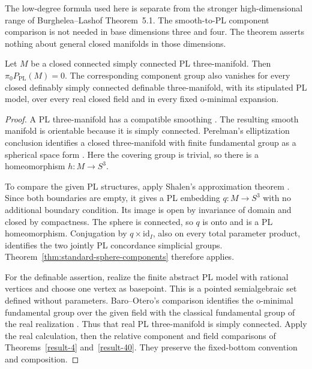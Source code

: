 The low-degree formula used here is separate from the stronger
high-dimensional range of Burghelea--Lashof Theorem~5.1.
The smooth-to-PL component comparison is not needed in base
dimensions three and four.  The theorem asserts nothing about
general closed manifolds in those dimensions.

\begin{corollary}\label{cor:simply-connected-three-components}
Let $M$ be a closed connected simply connected PL three-manifold.
Then $\pi_0P_{\mathrm{PL}}(M)=0$.  The corresponding component group
also vanishes for every closed definably simply connected definable
three-manifold, with its stipulated PL model, over every real closed
field and in every fixed o-minimal expansion.
\end{corollary}

\begin{proof}
A PL three-manifold has a compatible smoothing
\cite[Essay~I, p.~39]{KirbySiebenmann1977}.  The resulting smooth
manifold is orientable because it is simply connected.  Perelman's
elliptization conclusion identifies a closed three-manifold with
finite fundamental group as a spherical space form
\cite[Section~1.4, p.~3]{Perelman2003Extinction}.  Here the covering
group is trivial, so there is a homeomorphism $h:M\to S^3$.

To compare the given PL structures, apply Shalen's approximation
theorem \cite[Approximation Theorem, p.~34; proof in Section~9,
pp.~75--79]{Shalen1984}.  Since both boundaries are empty, it gives a
PL embedding $q:M\to S^3$ with no additional boundary condition.
Its image is open by invariance of domain and closed by compactness.
The sphere is connected, so $q$ is onto and is a PL homeomorphism.
Conjugation by $q\times\mathrm{id}_I$, also on every total parameter
product, identifies the two jointly PL concordance simplicial groups.
Theorem~\ref{thm:standard-sphere-components} therefore applies.

For the definable assertion, realize the finite abstract PL model
with rational vertices and choose one vertex as basepoint.  This is
a pointed semialgebraic set defined without parameters.
Baro--Otero's comparison identifies the o-minimal fundamental group
over the given field with the classical fundamental group of the
real realization
\cite[arXiv version~1, Corollary~4.3, p.~10]{BaroOtero2008v1}.
Thus that real PL three-manifold is simply connected.  Apply the
real calculation, then the relative component and field comparisons
of Theorems~\ref{result-4} and~\ref{result-40}.  They preserve the
fixed-bottom convention and composition.
\end{proof}
